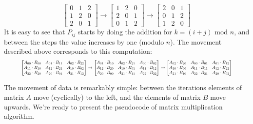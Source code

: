 \documentclass[12pt,a4paper,twoside,openright]{report}
\begin{document}
\begin{equation}
\begin{bmatrix}
0 & 1 & 2 \\
1 & 2 & 0\\
2 & 0 & 1 
\end{bmatrix}
\rightarrow
\begin{bmatrix}
1 & 2 & 0 \\
2 & 0 & 1\\
0 & 1 & 2
\end{bmatrix}
\rightarrow
\begin{bmatrix}
2 & 0 & 1 \\
0 & 1 & 2 \\
1 & 2 & 0
\end{bmatrix}
\end{equation}
It is easy to see that $P_{ij}$ starts by doing the addition for $k=(i+j)$ mod $n$, and between the steps the value increases by one (modulo $n$). The movement described above corresponds to this computation: 
\begin{equation}
\resizebox{0.9\hsize}{!}{$
\begin{bmatrix}
A_{00} \cdot B_{00} & A_{01} \cdot B_{11} & A_{02} \cdot B_{22} \\
A_{11} \cdot B_{10} & A_{12} \cdot B_{21} & A_{10} \cdot B_{02} \\
A_{22} \cdot B_{20} & A_{20} \cdot B_{01} & A_{21} \cdot B_{12} 
\end{bmatrix}
\rightarrow
\begin{bmatrix}
A_{01} \cdot B_{10} & A_{02} \cdot B_{21} & A_{00} \cdot B_{02} \\
A_{12} \cdot B_{20} & A_{10} \cdot B_{01} & A_{11} \cdot B_{12} \\
A_{20} \cdot B_{00} & A_{21} \cdot B_{11} & A_{22} \cdot B_{22} 
\end{bmatrix}
\rightarrow
\begin{bmatrix}
A_{02} \cdot B_{20} & A_{00} \cdot B_{01} & A_{01} \cdot B_{12} \\
A_{10} \cdot B_{00} & A_{11} \cdot B_{11} & A_{12} \cdot B_{22} \\
A_{21} \cdot B_{10} & A_{22} \cdot B_{21} & A_{20} \cdot B_{02} 
\end{bmatrix}
$}
\end{equation}

The movement of data is remarkably simple: between the iterations elements of matrix $A$ move (cyclically) to the left, and the elements of matrix $B$ move upwards. We're ready to present the pseudocode of matrix multiplication algorithm.
\end{document}
